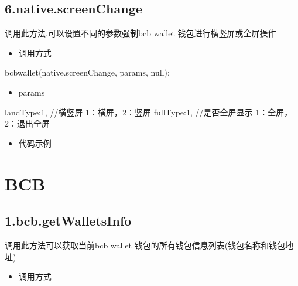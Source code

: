 \documentclass[letterpaper,10pt,english]{sphinxmanual}
\begin{document}
\subsection{6.native.screenChange}
\label{\detokenize{jsapi:native-screenchange}}
调用此方法,可以设置不同的参数强制bcb wallet 钱包进行横竖屏或全屏操作
\begin{itemize}
\item {} 
调用方式

\end{itemize}

\begin{sphinxVerbatim}[commandchars=\\\{\}]
bcbwallet(\PYGZsq{}native.screenChange\PYGZsq{}, params, null);
\end{sphinxVerbatim}
\begin{itemize}
\item {} 
params

\end{itemize}

\begin{sphinxVerbatim}[commandchars=\\\{\}]
\PYGZob{}
  \PYGZdq{}landType\PYGZdq{}:1, //横竖屏 1：横屏，2：竖屏
  \PYGZdq{}fullType\PYGZdq{}:1, //是否全屏显示 1：全屏，2：退出全屏
\PYGZcb{}
\end{sphinxVerbatim}
\begin{itemize}
\item {} 
代码示例

\end{itemize}

\begin{sphinxVerbatim}[commandchars=\\\{\}]
 
 
\end{sphinxVerbatim}


\section{BCB}
\label{\detokenize{jsapi:bcb}}

\subsection{1.bcb.getWalletsInfo}
\label{\detokenize{jsapi:bcb-getwalletsinfo}}
调用此方法可以获取当前bcb wallet
钱包的所有钱包信息列表(钱包名称和钱包地址)
\begin{itemize}
\item {} 
调用方式

\end{itemize}
\end{document}
